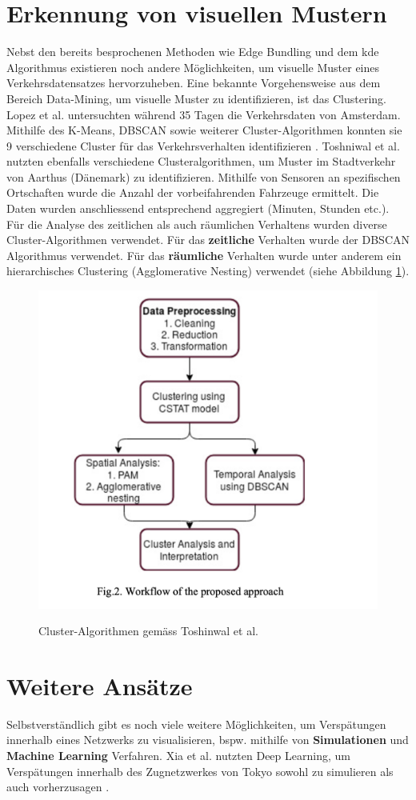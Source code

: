 \section{Erkennung von visuellen Mustern}
Nebst den bereits besprochenen Methoden wie Edge Bundling und dem \acrshort{kde} Algorithmus existieren noch andere Möglichkeiten, um visuelle Muster eines Verkehrsdatensatzes hervorzuheben. Eine bekannte Vorgehensweise aus dem Bereich Data-Mining, um visuelle Muster zu identifizieren, ist das Clustering. Lopez et al. untersuchten während 35 Tagen die Verkehrsdaten von Amsterdam. Mithilfe des K-Means, DBSCAN sowie weiterer Cluster-Algorithmen konnten sie 9 verschiedene Cluster für das Verkehrsverhalten identifizieren \parencite{lopez_2017}. Toshniwal et al. nutzten ebenfalls verschiedene Clusteralgorithmen, um Muster im Stadtverkehr von Aarthus (Dänemark) zu identifizieren. Mithilfe von Sensoren an spezifischen Ortschaften wurde die Anzahl der vorbeifahrenden Fahrzeuge ermittelt. Die Daten wurden anschliessend entsprechend aggregiert (Minuten, Stunden etc.). Für die Analyse des zeitlichen als auch räumlichen Verhaltens wurden diverse Cluster-Algorithmen verwendet. Für das \textbf{zeitliche} Verhalten wurde der DBSCAN Algorithmus verwendet. Für das \textbf{räumliche} Verhalten wurde unter anderem ein hierarchisches Clustering (Agglomerative Nesting) verwendet (siehe Abbildung \ref{fig_clustering_urban_traffic}).

\begin{figure}[H]
    \caption{Cluster-Algorithmen gemäss Toshinwal et al. \parencite[S. 1050]{clustering_urban_traffic_data}}
    \includegraphics[width=.5\linewidth]{content/00_assets/urban_traffic_clustering_methods.png}
    \label{fig_clustering_urban_traffic}
\end{figure}

\section{Weitere Ansätze}
Selbstverständlich gibt es noch viele weitere Möglichkeiten, um Verspätungen innerhalb eines Netzwerks zu visualisieren, bspw. mithilfe von \textbf{Simulationen} und \textbf{Machine Learning} Verfahren. Xia et al. nutzten Deep Learning, um Verspätungen innerhalb des Zugnetzwerkes von Tokyo sowohl zu simulieren als auch vorherzusagen \parencite[S.56]{xia_2018}.

